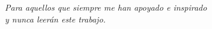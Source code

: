 \documentclass[\main/main.tex]{subfiles}
\begin{document}
\begin{titlepage}
	\nonumber
	\null{}
	\begin{flushright}
		\textit{
			Para aquellos que siempre me han apoyado e inspirado\\y nunca leerán este trabajo.
			}\\[5mm]
	\end{flushright}
	\null
\end{titlepage}
\end{document}
